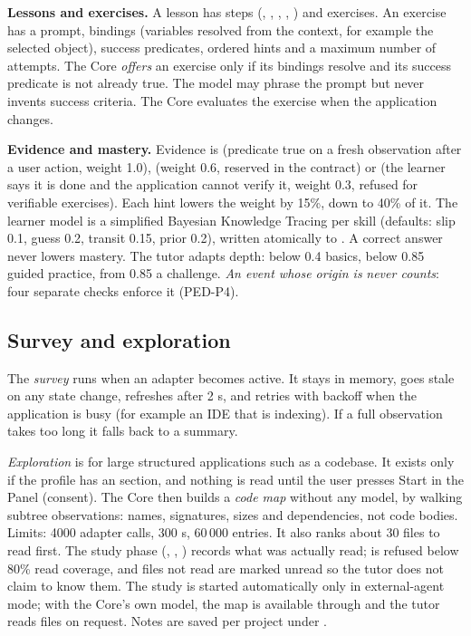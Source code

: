 \textbf{Lessons and exercises.} A lesson has steps (, , , , ) and exercises. An exercise has a prompt, bindings (variables resolved from the context, for example the selected object), success predicates, ordered hints and a maximum number of attempts. The Core \emph{offers} an exercise only if its bindings resolve and its success predicate is not already true. The model may phrase the prompt but never invents success criteria. The Core evaluates the exercise when the application changes.

\textbf{Evidence and mastery.} Evidence is  (predicate true on a fresh observation after a user action, weight 1.0),  (weight 0.6, reserved in the contract) or  (the learner says it is done and the application cannot verify it, weight 0.3, refused for verifiable exercises). Each hint lowers the weight by 15\%, down to 40\% of it. The learner model is a simplified Bayesian Knowledge Tracing per skill (defaults: slip 0.1, guess 0.2, transit 0.15, prior 0.2), written atomically to . A correct answer never lowers mastery. The tutor adapts depth: below 0.4 basics, below 0.85 guided practice, from 0.85 a challenge. \emph{An event whose origin is}  \emph{never counts}: four separate checks enforce it (PED-P4).

\subsection{Survey and exploration}

The \emph{survey} runs when an adapter becomes active. It stays in memory, goes stale on any state change, refreshes after 2 s, and retries with backoff when the application is busy (for example an IDE that is indexing). If a full observation takes too long it falls back to a summary.

\emph{Exploration} is for large structured applications such as a codebase. It exists only if the profile has an  section, and nothing is read until the user presses Start in the Panel (consent). The Core then builds a \emph{code map} without any model, by walking subtree observations: names, signatures, sizes and dependencies, not code bodies. Limits: 4000 adapter calls, 300 s, 60\,000 entries. It also ranks about 30 files to read first. The study phase (, , ) records what was actually read;  is refused below 80\% read coverage, and files not read are marked unread so the tutor does not claim to know them. The study is started automatically only in external-agent mode; with the Core's own model, the map is available through  and the tutor reads files on request. Notes are saved per project under .

